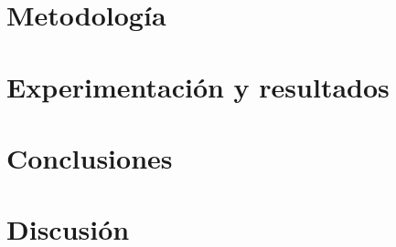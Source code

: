 \documentclass[conference]{IEEEtran}
\begin{document}
\section{Metodolog\'ia}



\section{Experimentaci\'on y resultados}


\section{Conclusiones}

\section{Discusi\'on}
\end{document}
